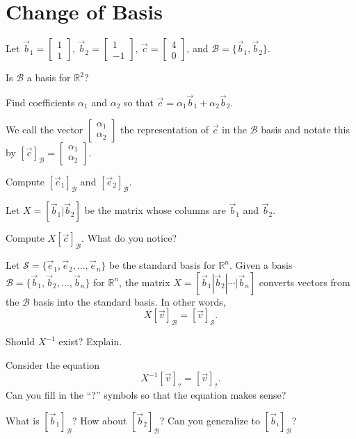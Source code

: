 \documentclass[14pt]{problemset}
\newcommand{\R}{\mathbb{R}}
\newcommand{\mat}[1]{\begin{bmatrix}#1\end{bmatrix}}
\begin{document}
\section*{Change of Basis}
	\question
	Let $\vec b_1=\mat{1\\1}$, $\vec b_2=\mat{1\\-1}$, $\vec c=\mat{4\\0}$, and $\mathcal B=\{\vec b_1,\vec b_2\}$.
	\begin{parts}
		\item Is $\mathcal B$ a basis for $\R^2$?
		\item Find coefficients $\alpha_1$ and $\alpha_2$ so that $\vec c=\alpha_1\vec b_1+\alpha_2\vec b_2$.
	\end{parts}
	We call the vector $\mat{\alpha_1\\\alpha_2}$ the representation of $\vec c$ in the $\mathcal B$ basis and notate
	this by $[\vec c]_{\mathcal B}=\mat{\alpha_1\\\alpha_2}$.
	\begin{parts}[resume]
		\item Compute $[\vec e_1]_{\mathcal B}$ and $[\vec e_2]_{\mathcal B}$.
	\end{parts}
	Let $X=[\vec b_1|\vec b_2]$ be the matrix whose columns are $\vec b_1$ and $\vec b_2$.
	\begin{parts}[resume]
		\item Compute $X[\vec c]_{\mathcal B}$.  What do you notice?
	\end{parts}

	
	\question
	Let $\mathcal S=\{\vec e_1,\vec e_2,\ldots,\vec e_n\}$ be the standard basis for $\R^n$.
	Given a basis $\mathcal B=\{\vec b_1,\vec b_2,\ldots,\vec b_n\}$ for $\R^n$, the 
	matrix $X=[\vec b_1|\vec b_2|\cdots|\vec b_n]$ converts
	vectors from the $\mathcal B$ basis into the standard basis.  In other words,
	\[
		X[\vec v]_{\mathcal B} = [\vec v]_{\mathcal S}.
	\]
	\begin{parts}
		\item Should $X^{-1}$ exist? Explain.
		\item Consider the equation\[
				X^{-1}[\vec v]_{?} = [\vec v]_{?}.
			\]
			Can you fill in the ``?'' symbols so that the equation makes sense?
		\item What is $[\vec b_1]_{\mathcal B}$?  How about $[\vec b_2]_{\mathcal B}$?  Can
			you generalize to $[\vec b_i]_{\mathcal B}$?
	\end{parts}
\end{document}
